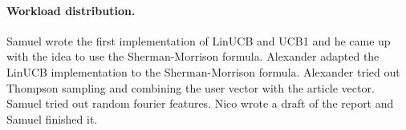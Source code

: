 \documentclass[a4paper,11pt]{article}
\begin{document}
\paragraph{Workload distribution.\!\!\!}

Samuel wrote the first implementation of LinUCB and UCB1 and he came up with the idea to use the Sherman-Morrison formula.
Alexander adapted the LinUCB implementation to the Sherman-Morrison formula. 
Alexander tried out Thompson sampling and combining the user vector with the article vector. 
Samuel tried out random fourier features. Nico wrote a draft of the report and Samuel finished it.
\end{document}
